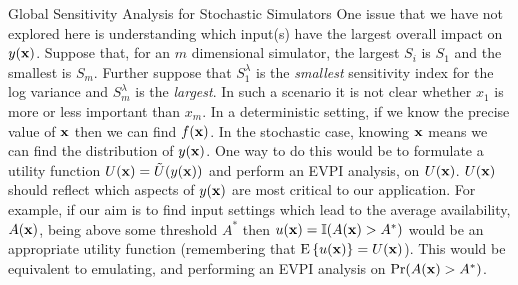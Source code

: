 \begin{chapter}{Global Sensitivity Analysis for Stochastic Simulators\label{Ch:sensitivity}}
One issue that we have not explored here is understanding which input(s) have the largest overall impact on $y(\mathbf{x})$. Suppose that, for an $m$ dimensional simulator, the largest $S_i$ is $S_1$ and the smallest is $S_m$. Further suppose that $S^{\lambda}_1$ is the \textit{smallest} sensitivity index for the log variance and $S^{\lambda}_m$ is the \textit{largest}. In such a scenario it is not clear whether $x_1$ is more or less important than $x_m$. In a deterministic setting, if we know the precise value of $\mathbf{x}$ then we can find $f(\mathbf{x})$. In the stochastic case, knowing $\mathbf{x}$ means we can find the distribution of $y(\mathbf{x})$. One way to do this would be to formulate a utility function $U(\mathbf{x}) = \tilde{U} ( y(\mathbf{x}))$ and perform an EVPI analysis, on $U(\mathbf{x})$. $U(\mathbf{x})$ should reflect which aspects of $y(\mathbf{x})$ are most critical to our application. For example, if our aim is to find input settings which lead to the average availability, $A(\mathbf{x})$, being above some threshold $A^{*}$ then $u(\mathbf{x}) = \mathbb{I}(A(\mathbf{x}) > A^{*})$ would be an appropriate utility function (remembering that $\textrm{E}\,\{u(\mathbf{x})\}  = U(\mathbf{x})$). This would be equivalent to emulating, and performing an EVPI analysis on $\Pr (A(\mathbf{x}) >  A^{*})$.


\end{chapter}
